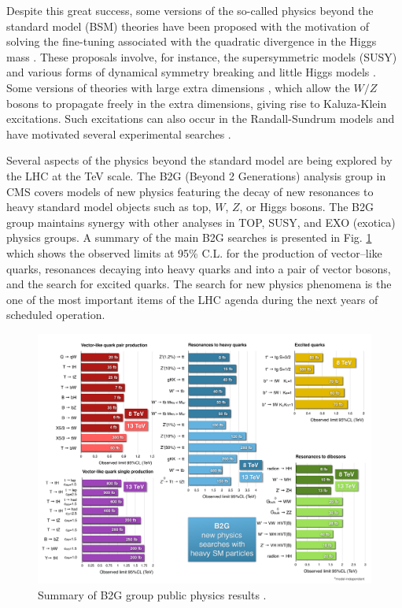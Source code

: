 Despite this great success, some versions of the so-called physics beyond the standard model (BSM) theories \cite{Allanach:2006fy} have been proposed with the motivation of solving the fine-tuning associated with the quadratic divergence in the Higgs mass \cite{Bustamante:2009us}. These proposals involve, for instance, the supersymmetric models (SUSY) \cite{Martin:1997ns} and various forms of dynamical symmetry breaking and little Higgs models \cite{Ellis:2009su}. Some versions of theories with large extra dimensions \cite{Csaki:2004ay}, which allow the $W/Z$ bosons to propagate freely in the extra dimensions, giving rise to Kaluza-Klein \cite{Dienes:2002hg} excitations. Such excitations can also occur in the Randall-Sundrum models \cite{Randall:1999ee} and have motivated several experimental searches \cite{Chatrchyan:2012rva,Khachatryan:2014hpa,Khachatryan:2014gha,Khachatryan:2015ywa,Khachatryan:2016cfa,Khachatryan:2016sey}. 

Several aspects of the physics beyond the standard model are being explored by the LHC at the TeV scale. The B2G (Beyond 2 Generations) analysis group in CMS covers models of new physics featuring the decay of new resonances to heavy standard model objects such as top, $W$,  $Z$, or Higgs bosons. The B2G group maintains synergy with other analyses in TOP, SUSY, and EXO (exotica) physics groups. A summary of the main B2G searches is presented in Fig. \ref{B2Gsummary} which shows the observed limits at 95\% C.L. for the production of vector--like quarks, resonances decaying into heavy quarks and into a pair of vector bosons, and the search for excited quarks. The search for new physics phenomena is the one of the most important items of the LHC agenda during the next years of scheduled operation.

\begin{figure}[htb!!]
\centering
\includegraphics[scale=0.58, angle=90]{figures/theory/B2GSummary.pdf}
\caption[B2G Summary]{Summary of B2G group public physics results \cite{CMS:B2Gsummary}.}
\label{B2Gsummary}
\end{figure}

